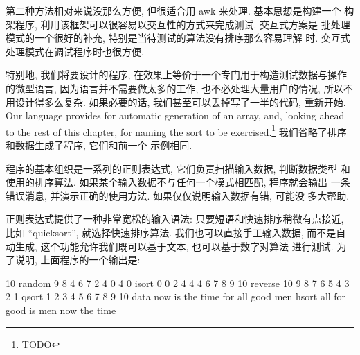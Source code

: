 第二种方法相对来说没那么方便, 但很适合用 awk 来处理. 基本思想是构建一个
构架程序, 利用该框架可以很容易以交互性的方式来完成测试. 交互式方案是
批处理模式的一个很好的补充, 特别是当待测试的算法没有排序那么容易理解
时. 交互式处理模式在调试程序时也很方便.

特别地, 我们将要设计的程序, 在效果上等价于一个专门用于构造测试数据与操作
的微型语言, 因为语言并不需要做太多的工作, 也不必处理大量用户的情况,
所以不用设计得多么复杂. 如果必要的话, 我们甚至可以丢掉写了一半的代码,
重新开始. Our language provides for automatic generation of an array, and,
looking ahead to the rest of this chapter, for naming the sort to be
exercised.\footnote{TODO} 我们省略了排序和数据生成子程序, 它们和前一个
示例相同.

程序的基本组织是一系列的正则表达式, 它们负责扫描输入数据, 判断数据类型
和使用的排序算法. 如果某个输入数据不与任何一个模式相匹配, 程序就会输出
一条错误消息, 并演示正确的使用方法. 如果仅仅说明输入数据有错, 可能没
多大帮助.

正则表达式提供了一种非常宽松的输入语法: 只要短语和快速排序稍微有点接近,
比如 ``quicksort'', 就选择快速排序算法. 我们也可以直接手工输入数据, 
而不是自动生成, 这个功能允许我们既可以基于文本, 也可以基于数字对算法
进行测试. 为了说明, 上面程序的一个输出是:
\begin{shell}
    10 random 
     9 8 4 6 7 2 4 0 4 0
    isort 
     0 0 2 4 4 4 6 7 8 9
    10 reverse 
     10 9 8 7 6 5 4 3 2 1
    qsort
     1 2 3 4 5 6 7 8 9 10 
    data now is the time for all good men
    hsort
     all for good is men now the time
\end{shell}

